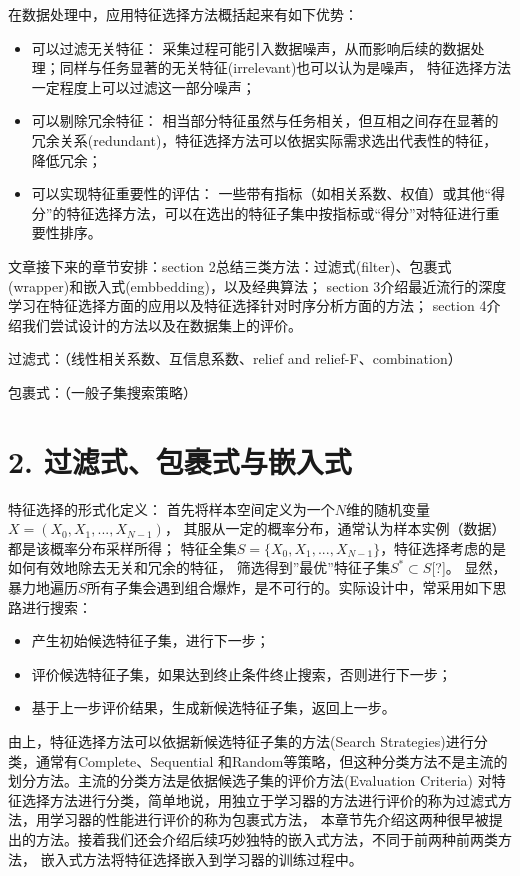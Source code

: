 \documentclass[a4paper,UTF8]{article}
\begin{document}
  在数据处理中，应用特征选择方法概括起来有如下优势：
  \begin{itemize}
    \item 可以过滤无关特征：
    采集过程可能引入数据噪声，从而影响后续的数据处理；同样与任务显著的无关特征(irrelevant)也可以认为是噪声，
    特征选择方法一定程度上可以过滤这一部分噪声；

    \item 可以剔除冗余特征：
    相当部分特征虽然与任务相关，但互相之间存在显著的冗余关系(redundant)，特征选择方法可以依据实际需求选出代表性的特征，
    降低冗余；

    \item 可以实现特征重要性的评估：
    一些带有指标（如相关系数、权值）或其他“得分”的特征选择方法，可以在选出的特征子集中按指标或“得分”对特征进行重要性排序。

  \end{itemize}

  文章接下来的章节安排：section 2总结三类方法：过滤式(filter)、包裹式(wrapper)和嵌入式(embbedding)，以及经典算法；
  section 3介绍最近流行的深度学习在特征选择方面的应用以及特征选择针对时序分析方面的方法；
  section 4介绍我们尝试设计的方法以及在数据集上的评价。

  过滤式：（线性相关系数、互信息系数、relief and relief-F、combination）

  包裹式：（一般子集搜索策略）





\section*{2. 过滤式、包裹式与嵌入式}
  特征选择的形式化定义：
  首先将样本空间定义为一个$ N $维的随机变量$ X = (X_{0}, X_{1}, ... , X_{N-1})$，
  其服从一定的概率分布，通常认为样本实例（数据）都是该概率分布采样所得；
  特征全集$ S = \{X_{0}, X_{1}, ... , X_{N-1}\} $，特征选择考虑的是如何有效地除去无关和冗余的特征，
  筛选得到”最优”特征子集$ S^{*} \subset S $[?]。
  显然，暴力地遍历$ S $所有子集会遇到组合爆炸，是不可行的。实际设计中，常采用如下思路进行搜索：

  \begin{itemize}

    \item 产生初始候选特征子集，进行下一步；
    \item 评价候选特征子集，如果达到终止条件终止搜索，否则进行下一步；
    \item 基于上一步评价结果，生成新候选特征子集，返回上一步。

  \end{itemize}
  由上，特征选择方法可以依据新候选特征子集的方法(Search Strategies)进行分类，通常有Complete、Sequential
  和Random等策略，但这种分类方法不是主流的划分方法。主流的分类方法是依据候选子集的评价方法(Evaluation Criteria)
  对特征选择方法进行分类，简单地说，用独立于学习器的方法进行评价的称为过滤式方法，用学习器的性能进行评价的称为包裹式方法，
  本章节先介绍这两种很早被提出的方法。接着我们还会介绍后续巧妙独特的嵌入式方法，不同于前两种前两类方法，
  嵌入式方法将特征选择嵌入到学习器的训练过程中。
\end{document}
